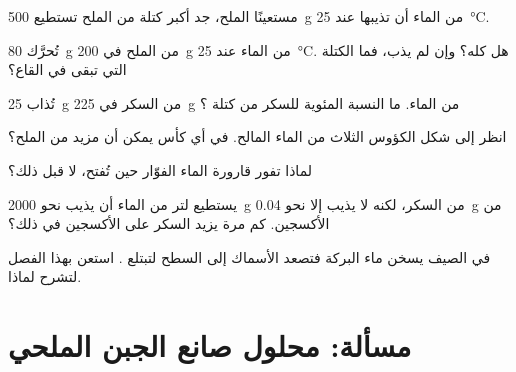 \begin{exercise}[$\star\star$]\label{exo:g6:solutions-and-solubility:6}
مستعينًا  الملح، جد أكبر كتلة من الملح تستطيع
\qty{500}{g} من الماء أن تذيبها عند \qty{25}{\celsius}.
\end{exercise}

\begin{exercise}[$\star\star$]\label{exo:g6:solutions-and-solubility:7}
تُحرَّك \qty{80}{g} من الملح في \qty{200}{g} من الماء عند
\qty{25}{\celsius}. هل  كله؟ وإن لم يذب، فما الكتلة التي تبقى في
القاع؟
\end{exercise}

\begin{exercise}[$\star\star$]\label{exo:g6:solutions-and-solubility:8}
تُذاب \qty{25}{g} من السكر في \qty{225}{g} من الماء. ما النسبة المئوية
للسكر من كتلة ؟
\end{exercise}

\begin{exercise}[$\star\star$]\label{exo:g6:solutions-and-solubility:9}
انظر إلى شكل الكؤوس الثلاث من الماء المالح. في أي كأس يمكن أن 
مزيد من الملح؟
\end{exercise}

\begin{exercise}[$\star\star$]\label{exo:g6:solutions-and-solubility:10}
لماذا تفور قارورة الماء الفوّار حين تُفتح، لا
قبل ذلك؟
\end{exercise}

\begin{exercise}[$\star\star\star$]\label{exo:g6:solutions-and-solubility:11}
يستطيع لتر من الماء أن يذيب نحو \qty{2000}{g} من السكر، لكنه لا يذيب
إلا نحو \qty{0.04}{g} من الأكسجين. كم مرة يزيد السكر على الأكسجين
في ذلك؟
\end{exercise}

\begin{exercise}[$\star\star\star$]\label{exo:g6:solutions-and-solubility:12}
في الصيف يسخن ماء البركة فتصعد الأسماك إلى السطح لتبتلع .
استعن بهذا الفصل لتشرح لماذا.
\end{exercise}

\section{مسألة: محلول صانع الجبن الملحي}

